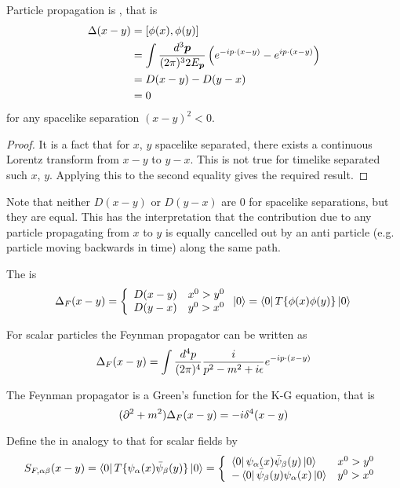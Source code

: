\documentclass{article}
\begin{document}
\begin{theorem}
Particle propagation is , that is 
\begin{align*}
    \Delta(x-y) &= \comm[\phi(x)]{\phi(y)} \\
     &= \int \LImeas \left( e^{-ip\cdot(x-y)} - e^{ip\cdot(x-y)} \right) \\
     &= D(x-y) - D(y-x) \\
     &= 0 
\end{align*}
for any spacelike separation $(x-y)^2 <0$. 
\end{theorem}
\begin{proof}
It is a fact that for $x$, $y$ spacelike separated, there exists a continuous Lorentz transform from $x-y$ to $y-x$. This is not true for timelike separated such $x$, $y$. Applying this to the second equality gives the required result. 
\end{proof}

\begin{idea}
Note that neither $D(x-y)$ or $D(y-x)$ are $0$ for spacelike separations, but they are equal. This has the interpretation that the contribution due to any particle propagating from $x$ to $y$ is equally cancelled out by an anti particle (e.g. particle moving backwards in time) along the same path.
\end{idea}

\begin{definition}
The  is 
\[
\Delta_F(x-y) = \left\{ \begin{array}{lc} D(x-y) & x^0 > y^0 \\
    D(y-x) & y^0 > x^0 
    \end{array} \right. \ket{0} = \bra{0} T\{\phi(x) \phi(y) \} \ket{0} \\
\]
\end{definition}

\begin{theorem}
For scalar particles the Feynman propagator can be written as 
\[
\Delta_F(x-y) = \int \fmeas \frac{i}{p^2-m^2+i\eps} e^{-ip\cdot(x-y)}
\]
\end{theorem}

\begin{corollary}
The Feynman propagator is a Green's function for the K-G equation, that is 
\[
(\del^2+m^2)\Delta_F(x-y) = -i \delta^4(x-y)
\]
\end{corollary}

\begin{definition}
Define the  in analogy to that for scalar fields by 
\[
S_{F,\alpha\beta}(x-y)=\bra{0} T\{ \psi_\alpha(x) \bar{\psi}_\beta(y) \} \ket{0} = \left\{ \begin{array}{lc} \bra{0} \psi_\alpha(x) \bar{\psi}_\beta(y)  \ket{0} & x^0 > y^0 \\
    -\bra{0} \bar{\psi}_\beta(y) \psi_\alpha(x) \ket{0} & y^0 > x^0 
    \end{array} \right. \\ 
\]
\end{definition}
\end{document}
